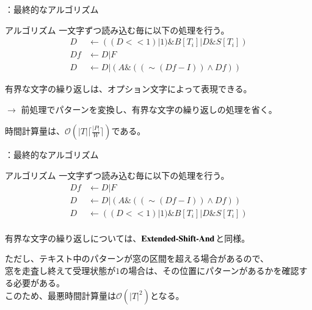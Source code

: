 \documentclass[dvipdfmx,12pt,beamer]{standalone}
\begin{document}
\begin{frame}{\ExShiftAnd：最終的なアルゴリズム}
	\begin{block}{アルゴリズム}	
		一文字ずつ読み込む毎に以下の処理を行う。
		\begin{align*}
			D &\leftarrow ((D << 1) | 1) \& B[T_i] | D \& S[T_i])\\
			Df &\leftarrow D | F \\
			D &\leftarrow D | (A \& ((\sim (Df - I)) \land Df))
		\end{align*}
	\end{block}

	有界な文字の繰り返しは、オプション文字によって表現できる。

	$\rightarrow$ 前処理でパターンを変換し、有界な文字の繰り返しの処理を省く。

	時間計算量は、$\mathcal{O}{(|T|	\lceil\frac{|P|}{W}\rceil)}$である。

\end{frame}

\begin{frame}{\ExBNDM：最終的なアルゴリズム}
	\begin{block}{アルゴリズム}	
		一文字ずつ読み込む毎に以下の処理を行う。
		\begin{align*}
			Df &\leftarrow D | F \\
			D &\leftarrow D | (A \& ((\sim (Df - I)) \land Df))\\
			D &\leftarrow ((D << 1) | 1) \& B[T_i] | D \& S[T_i])\\
		\end{align*}
		\vspace{-2em}
	\end{block}

	有界な文字の繰り返しについては、$\textbf{Extended-Shift-And}$と同様。

	ただし、テキスト中のパターンが窓の区間を超える場合があるので、\\
	窓を走査し終えて受理状態が$1$の場合は、その位置にパターンがあるかを確認する必要がある。
	\\このため、最悪時間計算量は$\mathcal{O}{(|T|^2)}$となる。

\end{frame}
\end{document}
